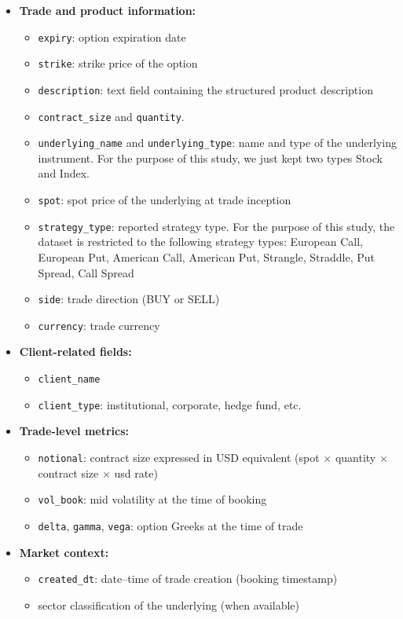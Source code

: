 \documentclass[12pt,a4paper]{report}
\begin{document}
\begin{itemize}
    \item \textbf{Trade and product information:}
    \begin{itemize}
        \item \texttt{expiry}: option expiration date
        \item \texttt{strike}: strike price of the option
        \item \texttt{description}: text field containing the structured product description
        \item \texttt{contract\_size} and \texttt{quantity}.
        \item \texttt{underlying\_name} and \texttt{underlying\_type}: name and type of the underlying instrument. For the purpose of this study, we just kept two types Stock and Index.
        \item \texttt{spot}: spot price of the underlying at trade inception
        \item \texttt{strategy\_type}: reported strategy type. For the purpose of this study, the dataset is restricted to the following strategy types: European Call, European Put, American Call, American Put, Strangle, Straddle, Put Spread, Call Spread
        \item \texttt{side}: trade direction (BUY or SELL)
        \item \texttt{currency}: trade currency
    \end{itemize}

    \item \textbf{Client-related fields:}
    \begin{itemize}
        \item \texttt{client\_name}
        \item \texttt{client\_type}: institutional, corporate, hedge fund, etc.
    \end{itemize}

    \item \textbf{Trade-level metrics:}
    \begin{itemize}
        \item \texttt{notional}: contract size expressed in USD equivalent (spot $\times$ quantity $\times$ contract size $\times$ usd rate)
        \item \texttt{vol\_book}: mid volatility at the time of booking
        \item \texttt{delta}, \texttt{gamma}, \texttt{vega}: option Greeks at the time of trade
    \end{itemize}


    \item \textbf{Market context:}
    \begin{itemize}
        \item \texttt{created\_dt}: date–time of trade creation (booking timestamp)
        \item sector classification of the underlying (when available)
    \end{itemize}
\end{itemize}
\end{document}
